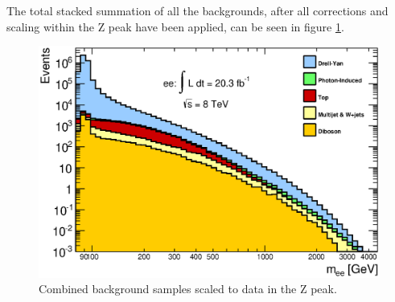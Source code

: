 The total stacked summation of all the backgrounds, after all corrections and scaling within the Z peak have been applied, can be seen in figure \ref{fig:totalBKG}.


   \begin{figure}[h]
      \begin{center}
      \includegraphics[width=0.98\linewidth]{images/invMass_bkgonly.eps}
      \end{center}
   \caption{Combined background samples scaled to data in the Z peak.}
   \label{fig:totalBKG}
   \end{figure}






